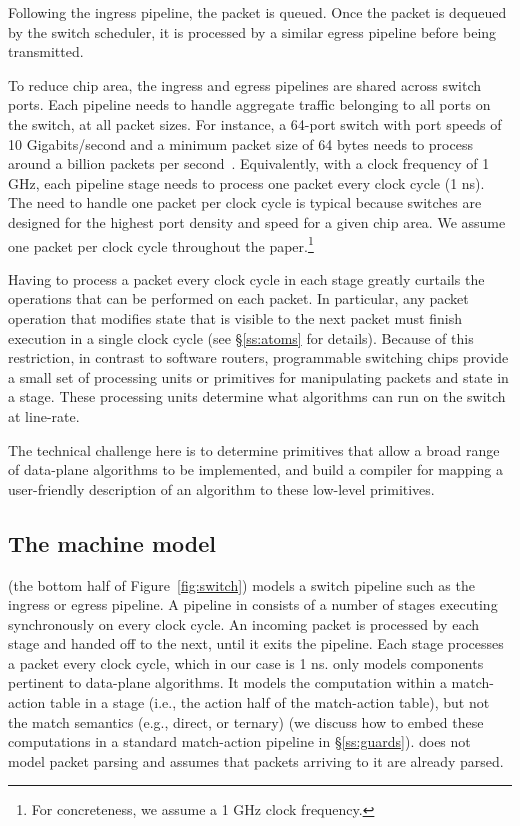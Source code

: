Following the ingress pipeline, the packet is queued. Once the packet
is dequeued by the switch scheduler, it is processed by a similar
egress pipeline before being transmitted.

To reduce chip area, the ingress and egress pipelines are shared
across switch ports.  Each pipeline needs to handle aggregate traffic
belonging to all ports on the switch, at all packet sizes.  For
instance, a 64-port switch with port speeds of 10 Gigabits/second and
a minimum packet size of 64 bytes needs to process around a billion
packets per second~\cite{rmt}.  Equivalently, with a clock frequency
of 1 GHz, each pipeline stage needs to process one packet every clock
cycle (1 ns).  The need to handle one packet per clock cycle is
typical because switches are designed for the highest port density and
speed for a given chip area. We assume one packet per clock
cycle throughout the paper.\footnote{For concreteness, we assume a 1
  GHz clock frequency.}

Having to process a packet every clock cycle in each stage greatly
curtails the operations that can be performed on each packet. In
particular, any packet operation that modifies state that is visible
to the next packet must finish execution in a single clock cycle (see
\S\ref{ss:atoms} for details). Because of this restriction, in
contrast to software routers, programmable switching chips provide a
small set of processing units or primitives for manipulating packets
and state in a stage. These processing units determine what algorithms
can run on the switch at line-rate.

The technical challenge here is to determine primitives that allow a
broad range of data-plane algorithms to be implemented, and build a
compiler for mapping a user-friendly description of an algorithm to
these low-level primitives.
\subsection{The \absmachine machine model}

\absmachine (the bottom half of Figure~\ref{fig:switch}) models a switch
pipeline such as the ingress or egress pipeline. A pipeline in \absmachine
consists of a number of stages executing synchronously on every clock cycle. An
incoming packet is processed by each stage and handed off to the next, until it
exits the pipeline. Each stage processes a packet every clock cycle, which in
our case is 1 ns. \absmachine only models components pertinent to data-plane
algorithms.  It models the computation within a match-action table in a stage
(i.e., the action half of the match-action table), but not the match semantics
(e.g., direct, or ternary) (we discuss how to embed these computations in a
standard match-action pipeline in \S\ref{ss:guards}). \absmachine does not
model packet parsing and assumes that packets arriving to it are already
parsed.

